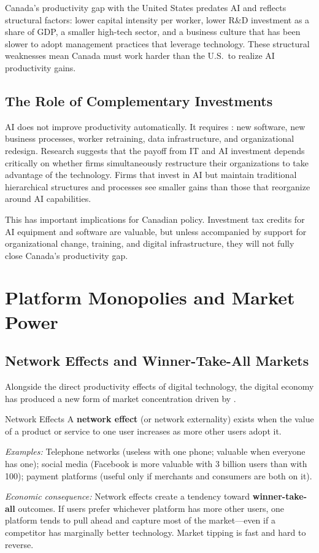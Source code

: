 Canada's productivity gap with the United States predates AI and reflects structural factors: lower capital intensity per worker, lower R\&D investment as a share of GDP, a smaller high-tech sector, and a business culture that has been slower to adopt management practices that leverage technology. These structural weaknesses mean Canada must work harder than the U.S.\ to realize AI productivity gains.

\subsection{The Role of Complementary Investments}

AI does not improve productivity automatically. It requires : new software, new business processes, worker retraining, data infrastructure, and organizational redesign. Research suggests that the payoff from IT and AI investment depends critically on whether firms simultaneously restructure their organizations to take advantage of the technology. Firms that invest in AI but maintain traditional hierarchical structures and processes see smaller gains than those that reorganize around AI capabilities.

This has important implications for Canadian policy. Investment tax credits for AI equipment and software are valuable, but unless accompanied by support for organizational change, training, and digital infrastructure, they will not fully close Canada's productivity gap.

\section{Platform Monopolies and Market Power}

\subsection{Network Effects and Winner-Take-All Markets}

Alongside the direct productivity effects of digital technology, the digital economy has produced a new form of market concentration driven by .

\begin{defbox}{Network Effects}
A \textbf{network effect} (or network externality) exists when the value of a product or service to one user increases as more other users adopt it.

\textit{Examples:} Telephone networks (useless with one phone; valuable when everyone has one); social media (Facebook is more valuable with 3 billion users than with 100); payment platforms (useful only if merchants and consumers are both on it).

\textit{Economic consequence:} Network effects create a tendency toward \textbf{winner-take-all} outcomes. If users prefer whichever platform has more other users, one platform tends to pull ahead and capture most of the market---even if a competitor has marginally better technology. Market tipping is fast and hard to reverse.
\end{defbox}

